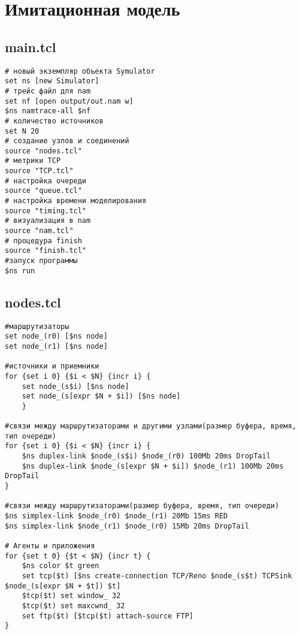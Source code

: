 
\chapter{Имитационная модель}
\label{app1}

\section*{main.tcl}
\label{app1:sec1}

\begin{verbatim}
# новый экземпляр объекта Symulator
set ns [new Simulator]
# трейс файл для nam
set nf [open output/out.nam w]
$ns namtrace-all $nf
# количество источников 
set N 20
# создание узлов и соединений
source "nodes.tcl"
# метрики TCP
source "TCP.tcl"
# настройка очереди		
source "queue.tcl"
# настройка времени моделирования  		
source "timing.tcl" 		
# визуализация в nam
source "nam.tcl"   		
# процедура finish
source "finish.tcl"                                                                         
#запуск программы
$ns run
\end{verbatim}


\section*{nodes.tcl}
\label{app1:sec2}
\begin{verbatim}
#маршрутизаторы
set node_(r0) [$ns node]  
set node_(r1) [$ns node]  

#источники и приемники
for {set i 0} {$i < $N} {incr i} {
	set node_(s$i) [$ns node] 		
	set node_(s[expr $N + $i]) [$ns node]	
	}

#связи между маршрутизаторами и другими узлами(размер буфера, время, тип очереди)
for {set i 0} {$i < $N} {incr i} {
	$ns duplex-link $node_(s$i) $node_(r0) 100Mb 20ms DropTail
	$ns duplex-link $node_(s[expr $N + $i]) $node_(r1) 100Mb 20ms DropTail
}

#связи между маршрутизаторами(размер буфера, время, тип очереди)
$ns simplex-link $node_(r0) $node_(r1) 20Mb 15ms RED
$ns simplex-link $node_(r1) $node_(r0) 15Mb 20ms DropTail

# Агенты и приложения
for {set t 0} {$t < $N} {incr t} {
	$ns color $t green
	set tcp($t) [$ns create-connection TCP/Reno $node_(s$t) TCPSink $node_(s[expr $N + $t]) $t]
	$tcp($t) set window_ 32
	$tcp($t) set maxcwnd_ 32
	set ftp($t) [$tcp($t) attach-source FTP]
}
\end{verbatim}

